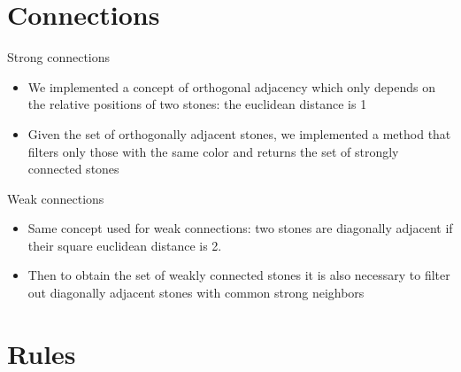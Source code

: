 \documentclass{beamer}
\begin{document}
\section{Connections}

\begin{frame}{Strong connections}
\begin{itemize}
	\item We implemented a concept of orthogonal adjacency which only depends on the relative positions of two stones: the euclidean distance is 1
	\item Given the set of orthogonally adjacent stones, we implemented a method that filters only those with the same color and returns the set of strongly connected stones
\end{itemize}
	
\end{frame}

\begin{frame}{Weak connections}
\begin{itemize}
		\item Same concept used for weak connections: two stones are diagonally adjacent if their square euclidean distance is 2.	
		\item Then to obtain the set of weakly connected stones it is also necessary to filter out diagonally adjacent stones with common strong neighbors
\end{itemize}

	
\end{frame}



\section{Rules}
\end{document}
